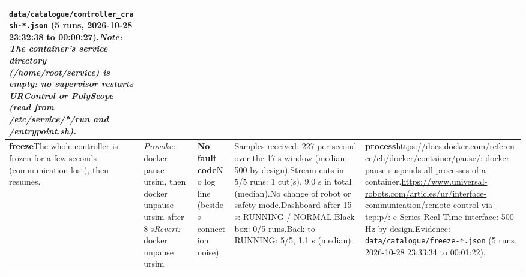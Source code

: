 \documentclass[10pt]{article}
\begin{document}
\begin{longtable}{@{}>{\raggedright\arraybackslash}p{2.7cm}>{\raggedright\arraybackslash}p{4.0cm}>{\raggedright\arraybackslash}p{7.6cm}>{\raggedright\arraybackslash}p{5.2cm}>{\raggedright\arraybackslash}p{6.0cm}@{}}
\texttt{data/catalogue/controller\_\allowbreak{}crash-*.json} (5 runs, 2026-10-28 23:32:38 to 00:00:27).\newline \textit{Note: The container's service directory (/home/root/service) is empty: no supervisor restarts URControl or PolyScope (read from /etc/service/*/run and /entrypoint.sh).} \\ \midrule
\textbf{freeze}\newline The whole controller is frozen for a few seconds (communication lost),\allowbreak{} then resumes. & \textit{Provoke:} docker pause ursim,\allowbreak{} then docker unpause ursim after 8 s\newline\textit{Revert:} docker unpause ursim & \textbf{No fault code}\newline No log line (besides connection noise). & Samples received: 227 per second over the 17 s window (median; 500 by design).\newline Stream cuts in 5/5 runs: 1 cut(s), 9.0 s in total (median).\newline No change of robot or safety mode.\newline Dashboard after 15 s: RUNNING / NORMAL.\newline Black box: 0/5 runs.\newline Back to RUNNING: 5/5, 1.1 s (median). & \textbf{process}\newline \url{https://docs.docker.com/reference/cli/docker/container/pause/}: docker pause suspends all processes of a container.\newline \url{https://www.universal-robots.com/articles/ur/interface-communication/remote-control-via-tcpip/}: e-Series Real-Time interface: 500 Hz by design.\newline Evidence: \texttt{data/catalogue/freeze-*.json} (5 runs, 2026-10-28 23:33:34 to 00:01:22). \\ \midrule

\end{longtable}
\end{document}
